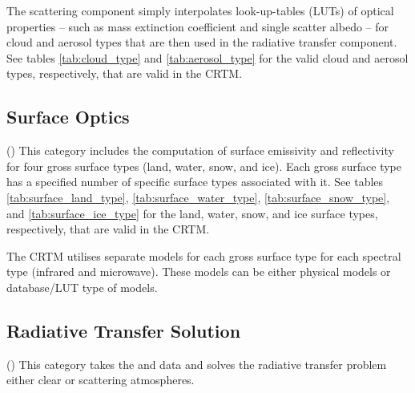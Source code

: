 The scattering component simply interpolates look-up-tables (LUTs) of optical properties -- such as mass extinction coefficient and single scatter albedo -- for cloud and aerosol types that are then used in the radiative transfer component. See tables \ref{tab:cloud_type} and \ref{tab:aerosol_type} for the valid cloud and aerosol types, respectively, that are valid in the CRTM.


\subsection{Surface Optics}
(\SfcOptics) This category includes the computation of surface emissivity and reflectivity for four gross surface types (land, water, snow, and ice). Each gross surface type has a specified number of specific surface types associated with it. See tables \ref{tab:surface_land_type}, \ref{tab:surface_water_type}, \ref{tab:surface_snow_type}, and \ref{tab:surface_ice_type} for the land, water, snow, and ice surface types, respectively, that are valid in the CRTM.

The CRTM utilises separate models for each gross surface type for each spectral type (infrared and microwave). These models can be either physical models or database/LUT type of models.


\subsection{Radiative Transfer Solution}
(\RTSolution) This category takes the \AtmOptics{} and \SfcOptics{} data and solves the radiative transfer problem either clear or scattering atmospheres.


